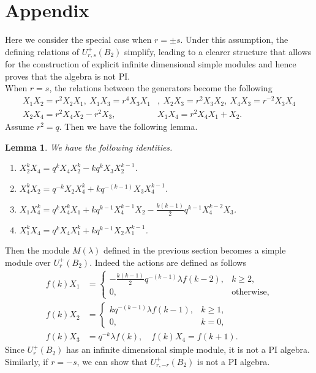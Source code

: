 \documentclass[12 pt,reqno]{amsart}
\numberwithin{equation}{section}
\newtheorem{lemma}[thm]{Lemma}
\theoremstyle{definition}
\theoremstyle{definition}
\theoremstyle{remark}
\theoremstyle{remark}
\begin{document}
\section*{Appendix} 
Here we consider the special case when $r =\pm s$. Under this assumption, the defining relations of $U_{r,s}^+(B_2)$ simplify, leading to a clearer structure that allows for the construction of explicit infinite dimensional simple modules and hence proves that the algebra is not PI.\\
When $r=s$, the relations between the generators become the following
\begin{align*}
    X_1X_2=r^2X_2X_1, \ X_1X_3=r^4X_3X_1&, \ X_2X_3=r^2X_3X_2, \ X_4X_3=r^{-2}X_3X_4\\
    X_2X_4=r^2X_4X_2-r^2X_3, \ & X_1X_4=r^2X_4X_1+X_2.
\end{align*} Assume $r^2=q$. Then we have the following lemma.
\begin{lemma}
    We have the following identities.
    \begin{enumerate}[label= \((\arabic*)\)]
        \item $X_2^kX_4=q^kX_4X_2^k-kq^kX_3X_2^{k-1}$.
        \item $X_4^kX_2=q^{-k}X_2X_4^k+kq^{-(k-1)}X_3X_4^{k-1}$.
        \item $X_1X_4^k=q^kX_4^kX_1+kq^{k-1}X_4^{k-1}X_2-\displaystyle \frac{k(k-1)}{2}q^{k-1}X_4^{k-2}X_3$.
        \item $X_1^kX_4=q^kX_4X_1^k+kq^{k-1}X_2X_1^{k-1}$.
    \end{enumerate}
\end{lemma}
Then the module $M(\lambda)$ defined in the previous section becomes a simple module over $U_{r}^+(B_2)$. Indeed the actions are defined as follows
\begin{align*}
    f(k)X_1&=\begin{cases}
        -\displaystyle\frac{k(k-1)}{2}q^{-(k-1)}\lambda f(k-2), & k \geq 2,\\
        0, & \text{otherwise,}
        \end{cases}\\
        f(k)X_2&=\begin{cases}
            kq^{-(k-1)}\lambda f(k-1),& k \geq 1,\\
            0,& k=0,
        \end{cases} \\
        f(k)X_3&=q^{-k}\lambda f(k),\quad
        f(k)X_4=f(k+1).
\end{align*}
 Since $U_{r}^+(B_2)$ has an infinite dimensional simple module, it is not a PI algebra.\\
Similarly, if $r=-s$, we can show that $U_{r,-r}^+(B_2)$ is not a PI algebra.


\end{document}
